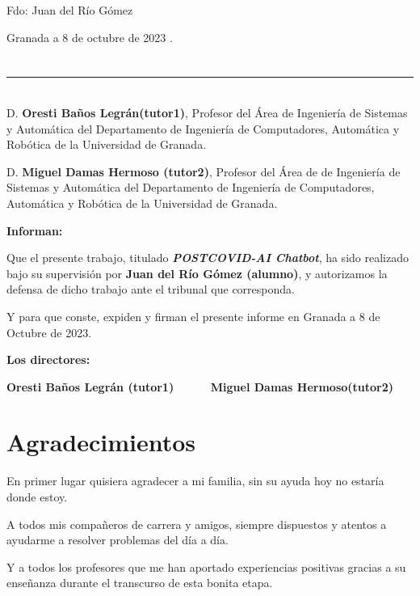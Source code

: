 \noindent Fdo: Juan del Río Gómez


\vspace{2cm}

\begin{flushright}
Granada a 8 de octubre de 2023 .
\end{flushright}


\chapter*{}
\thispagestyle{empty}

\noindent\rule[-1ex]{\textwidth}{2pt}\\[4.5ex]

D. \textbf{Oresti Baños Legrán(tutor1)}, Profesor del Área de Ingeniería de Sistemas y Automática del Departamento de Ingeniería de Computadores, Automática y Robótica de la Universidad de Granada.

\vspace{0.5cm}

D. \textbf{Miguel Damas Hermoso (tutor2)}, Profesor del Área de de Ingeniería de Sistemas y Automática del Departamento de Ingeniería de Computadores, Automática y Robótica de la Universidad de Granada.


\vspace{0.5cm}

\textbf{Informan:}

\vspace{0.5cm}

Que el presente trabajo, titulado \textit{\textbf{POSTCOVID-AI Chatbot}},
ha sido realizado bajo su supervisión por \textbf{Juan del Río Gómez (alumno)}, y autorizamos la defensa de dicho trabajo ante el tribunal
que corresponda.

\vspace{0.5cm}

Y para que conste, expiden y firman el presente informe en Granada a 8 de Octubre de 2023.

\vspace{1cm}

\textbf{Los directores:}

\vspace{5cm}

\noindent \textbf{Oresti Baños Legrán (tutor1) \ \ \ \ \ Miguel Damas Hermoso(tutor2)}

\chapter*{Agradecimientos}
\thispagestyle{empty}

       \vspace{1cm}

En primer lugar quisiera agradecer a mi familia, sin su ayuda hoy no estaría donde estoy.

A todos mis compañeros de carrera y amigos, siempre dispuestos y atentos a ayudarme a resolver problemas del día a día.

Y a todos los profesores que me han aportado experiencias positivas gracias a su enseñanza durante el transcurso de esta bonita etapa. 
    


